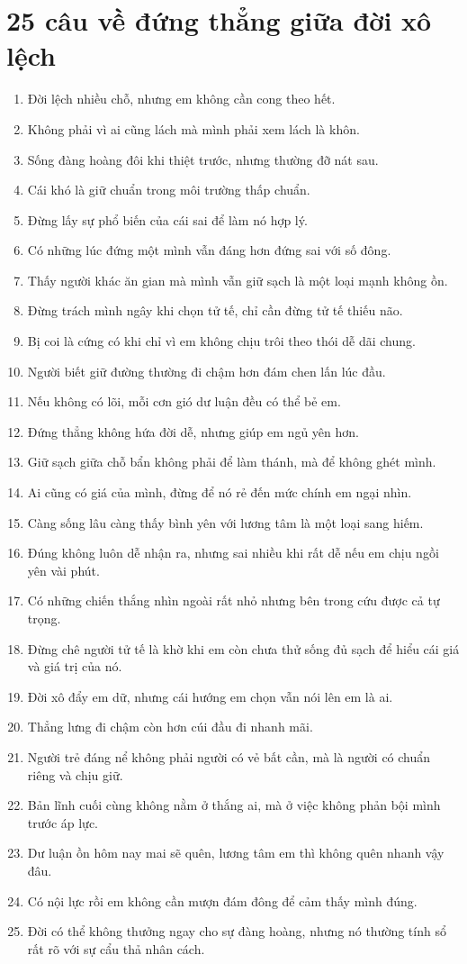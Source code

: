 \section{25 câu về đứng thẳng giữa đời xô lệch}
\begin{enumerate}[leftmargin=*,resume]
\item Đời lệch nhiều chỗ, nhưng em không cần cong theo hết.
\item Không phải vì ai cũng lách mà mình phải xem lách là khôn.
\item Sống đàng hoàng đôi khi thiệt trước, nhưng thường đỡ nát sau.
\item Cái khó là giữ chuẩn trong môi trường thấp chuẩn.
\item Đừng lấy sự phổ biến của cái sai để làm nó hợp lý.
\item Có những lúc đứng một mình vẫn đáng hơn đứng sai với số đông.
\item Thấy người khác ăn gian mà mình vẫn giữ sạch là một loại mạnh không ồn.
\item Đừng trách mình ngây khi chọn tử tế, chỉ cần đừng tử tế thiếu não.
\item Bị coi là cứng có khi chỉ vì em không chịu trôi theo thói dễ dãi chung.
\item Người biết giữ đường thường đi chậm hơn đám chen lấn lúc đầu.
\item Nếu không có lõi, mỗi cơn gió dư luận đều có thể bẻ em.
\item Đứng thẳng không hứa đời dễ, nhưng giúp em ngủ yên hơn.
\item Giữ sạch giữa chỗ bẩn không phải để làm thánh, mà để không ghét mình.
\item Ai cũng có giá của mình, đừng để nó rẻ đến mức chính em ngại nhìn.
\item Càng sống lâu càng thấy bình yên với lương tâm là một loại sang hiếm.
\item Đúng không luôn dễ nhận ra, nhưng sai nhiều khi rất dễ nếu em chịu ngồi yên vài phút.
\item Có những chiến thắng nhìn ngoài rất nhỏ nhưng bên trong cứu được cả tự trọng.
\item Đừng chê người tử tế là khờ khi em còn chưa thử sống đủ sạch để hiểu cái giá và giá trị của nó.
\item Đời xô đẩy em dữ, nhưng cái hướng em chọn vẫn nói lên em là ai.
\item Thẳng lưng đi chậm còn hơn cúi đầu đi nhanh mãi.
\item Người trẻ đáng nể không phải người có vẻ bất cần, mà là người có chuẩn riêng và chịu giữ.
\item Bản lĩnh cuối cùng không nằm ở thắng ai, mà ở việc không phản bội mình trước áp lực.
\item Dư luận ồn hôm nay mai sẽ quên, lương tâm em thì không quên nhanh vậy đâu.
\item Có nội lực rồi em không cần mượn đám đông để cảm thấy mình đúng.
\item Đời có thể không thưởng ngay cho sự đàng hoàng, nhưng nó thường tính sổ rất rõ với sự cẩu thả nhân cách.
\end{enumerate}

